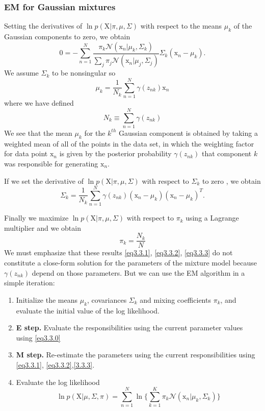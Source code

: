 \documentclass[a4paper]{book}
\newcommand{\normD}{\mathcal{N}}
\newcommand{\mrm}{\mathrm}
\begin{document}
\subsubsection*{EM for Gaussian mixtures}
Setting the derivatives of $\ln p(\mrm X|\pi,\mu,\Sigma)$ with respect to the means $\mu_k$ of the Gaussian components to zero, we obtain
\begin{equation}\label{}
  0=-\sum_{n=1}^{N}\frac{\pi_k\normD (\mrm x_n|\mu_k,\Sigma_k)}{\sum_j\pi_j\normD(\mrm x_n|\mu_j,\Sigma_j)}\Sigma_k(\mrm x_n-\mu_k).
\end{equation}
We assume $\Sigma_k$ to be nonsingular so
\begin{equation}\label{eq3.3.1}
  \mu_k=\frac{1}{N_k}\sum_{n=1}^{N}\gamma(z_{nk})\mrm x_n
\end{equation}
where we have defined
\begin{equation}\label{}
  N_k \equiv \sum_{n=1}^{N}\gamma(z_{nk})
\end{equation}
We see that the mean $\mu_k$ for the $k^{th}$ Gaussian
component is obtained by taking a weighted mean of all of the points in the data set,
in which the weighting factor for data point $\mrm x_n$ is given by the posterior probability
$\gamma(z_{nk})$ that component $k$ was responsible for generating $\mrm x_n$.

If we set the derivative of $\ln p(\mrm X|\pi,\mu,\Sigma)$ with respect to $\Sigma_k$ to zero , we obtain
\begin{equation}\label{eq3.3.2}
  \Sigma_k=\frac{1}{N_k}\sum_{n=1}^{N}\gamma(z_{nk})(\mrm x_n-\mu_k)(\mrm x_n-\mu_k)^T.
\end{equation}

Finally we maximize $\ln p(\mrm X|\pi,\mu,\Sigma)$ with respect to $\pi_k$ using a Lagrange multiplier and we obtain
\begin{equation}\label{eq3.3.3}
  \pi_k=\frac{N_k}{N}
\end{equation}
We must emphasize that these results \ref{eq3.3.1}, \ref{eq3.3.2}, \ref{eq3.3.3} do not constitute a close-form solution for the parameters of the mixture model because $\gamma(z_{nk})$ depend on those parameters. But we can use the EM algorithm in a simple iteration:
\begin{enumerate}
  \item Initialize the means $\mu_k$, covariances $\Sigma_k$ and mixing coefficients $\pi_k$, and evaluate the initial value of the log likelihood.
  \item \textbf{E step.} Evaluate the responsibilities using the current parameter values using \ref{eq3.3.0}
  \item \textbf{M step.} Re-estimate the parameters using the current responsibilities using \ref{eq3.3.1}, \ref{eq3.3.2},\ref{3.3.3}.
  \item Evaluate the log likelihood
  \begin{equation}\label{}
    \ln p(\mrm X|\mu,\Sigma,\pi)=\sum_{n=1}^{N}\ln \{\sum_{k=1}^{K}\pi_k\normD(\mrm x_n|\mu_k,\Sigma_k)\}
  \end{equation}
\end{enumerate}
\end{document}
